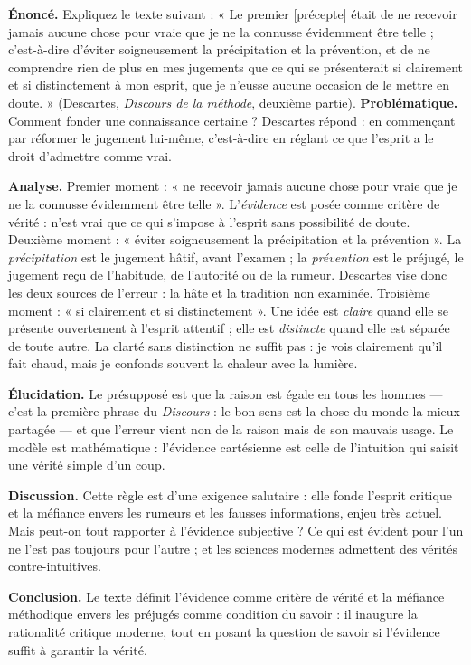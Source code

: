 \documentclass[11pt]{article}
\begin{document}
\begin{exoresolu}
\textbf{Énoncé.} Expliquez le texte suivant : « Le premier [précepte] était de ne recevoir jamais aucune chose pour vraie que je ne la connusse évidemment être telle ; c'est-à-dire d'éviter soigneusement la précipitation et la prévention, et de ne comprendre rien de plus en mes jugements que ce qui se présenterait si clairement et si distinctement à mon esprit, que je n'eusse aucune occasion de le mettre en doute. » (Descartes, \emph{Discours de la méthode}, deuxième partie).
\tcblower
\textbf{Problématique.} Comment fonder une connaissance certaine ? Descartes répond : en commençant par réformer le jugement lui-même, c'est-à-dire en réglant ce que l'esprit a le droit d'admettre comme vrai.

\textbf{Analyse.} Premier moment : « ne recevoir jamais aucune chose pour vraie que je ne la connusse évidemment être telle ». L'\emph{évidence} est posée comme critère de vérité : n'est vrai que ce qui s'impose à l'esprit sans possibilité de doute. Deuxième moment : « éviter soigneusement la précipitation et la prévention ». La \emph{précipitation} est le jugement hâtif, avant l'examen ; la \emph{prévention} est le préjugé, le jugement reçu de l'habitude, de l'autorité ou de la rumeur. Descartes vise donc les deux sources de l'erreur : la hâte et la tradition non examinée. Troisième moment : « si clairement et si distinctement ». Une idée est \emph{claire} quand elle se présente ouvertement à l'esprit attentif ; elle est \emph{distincte} quand elle est séparée de toute autre. La clarté sans distinction ne suffit pas : je vois clairement qu'il fait chaud, mais je confonds souvent la chaleur avec la lumière.

\textbf{Élucidation.} Le présupposé est que la raison est égale en tous les hommes — c'est la première phrase du \emph{Discours} : le bon sens est la chose du monde la mieux partagée — et que l'erreur vient non de la raison mais de son mauvais usage. Le modèle est mathématique : l'évidence cartésienne est celle de l'intuition qui saisit une vérité simple d'un coup.

\textbf{Discussion.} Cette règle est d'une exigence salutaire : elle fonde l'esprit critique et la méfiance envers les rumeurs et les fausses informations, enjeu très actuel. Mais peut-on tout rapporter à l'évidence subjective ? Ce qui est évident pour l'un ne l'est pas toujours pour l'autre ; et les sciences modernes admettent des vérités contre-intuitives.

\textbf{Conclusion.} Le texte définit l'évidence comme critère de vérité et la méfiance méthodique envers les préjugés comme condition du savoir : il inaugure la rationalité critique moderne, tout en posant la question de savoir si l'évidence suffit à garantir la vérité.
\end{exoresolu}
\end{document}
